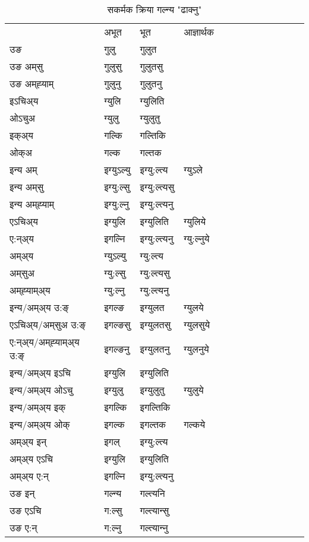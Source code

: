 \begin{table}[H]
\centering
\caption{\label{ul.vt} सकर्मक क्रिया  गल्न्य  "ढाक्नु"  }
\begin{tabular}{l|l|l|l|l|l|l|l|l|l|l|l|l}  \toprule
&अभूत & भूत & आज्ञार्थक \\ 
उङ &गुलु &गुलुत \\ 
उङ अम्‌सु &गुलुसु &गुलुतसु \\ 
उङ अम्‌ह्‍याम् &गुलुनु &गुलुतनु \\ 
इऽचिअ्य &ग्युलि &ग्युलिति   \\ 
ओऽचुअ &ग्युलु &ग्युलुतु   \\ 
इक्अ्य &गल्कि &गल्तिकि   \\ 
ओक्अ &गल्क &गल्तक   \\ 
इन्य अम् & इग्युऽल्यु  & इग्यु:ल्त्य &ग्युऽले  \\ 
इन्य अम्‌सु & इग्यु:ल्सु  & इग्यु:ल्त्यसु   \\ 
इन्य अम्‌ह्‍याम् & इग्यु:ल्नु  & इग्यु:ल्त्यनु   \\ 
एऽचिअ्य & इग्युलि & इग्युलिति &ग्युलिये    \\ 
ए:न्अ्य & इगल्नि  & इग्यु:ल्त्यनु &ग्यु:ल्नुये  \\ 
अम्अ्य & ग्युऽल्यु  & ग्यु:ल्त्य  \\ 
अम्‌सुअ & ग्यु:ल्सु & ग्यु:ल्त्यसु  \\ 
अम्‌ह्‍याम्अ्य & ग्यु:ल्नु  & ग्यु:ल्त्यनु \\ 
\midrule
इन्य/अम्अ्य उ:ङ्‌&इगल्ङ & इग्युलत &ग्युलये \\ 
एऽचिअ्य/अम्‌सुअ उ:ङ्‌ &इगल्ङसु & इग्युलतसु &ग्युलसुये \\ 
ए:न्अ्य/अम्‌ह्‍याम्अ्य उ:ङ्‌ &इगल्ङनु & इग्युलतनु &ग्युलनुये \\ 
इन्य/अम्अ्य इऽचि & इग्युलि & इग्युलिति    \\ 
इन्य/अम्अ्य ओऽचु & इग्युलु & इग्युलुतु  &ग्युलुये  \\ 
इन्य/अम्अ्य इक् & इगल्कि & इगल्तिकि   \\ 
इन्य/अम्अ्य ओक् & इगल्क & इगल्तक  &गल्कये  \\ 
अम्अ्य इन् & इगल् & इग्यु:ल्त्य   \\ 
अम्अ्य एऽचि & इग्युलि & इग्युलिति    \\ 
अम्अ्य ए:न् & इगल्नि  & इग्यु:ल्त्यनु  \\ 
\midrule
उङ इन् & गल्न्य  & गल्त्यनि  \\ 
उङ एऽचि & ग:ल्सु  & गल्त्यान्सु   \\ 
उङ ए:न्& ग:ल्नु  & गल्त्यान्‍नु   \\ 
\bottomrule
\end{tabular}
\end{table}


